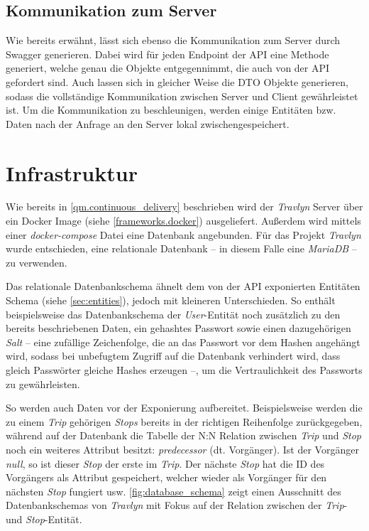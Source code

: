 		\subsection{Kommunikation zum Server}  %
		
			Wie bereits erwähnt, lässt sich ebenso die Kommunikation zum Server durch Swagger generieren. Dabei wird für jeden Endpoint der \acs{API} eine Methode generiert, welche genau die Objekte entgegennimmt, die auch von der \acs{API} gefordert sind. Auch lassen sich in gleicher Weise die \acs{DTO} Objekte generieren, sodass die vollständige Kommunikation zwischen Server und Client gewährleistet ist. Um die Kommunikation zu beschleunigen, werden einige Entitäten bzw. Daten nach der Anfrage an den Server lokal zwischengespeichert. 

	\section{Infrastruktur} %
	
		Wie bereits in \autoref{qm.continuous_delivery} beschrieben wird der \textit{Travlyn} Server über ein Docker Image (siehe \autoref{frameworks.docker}) ausgeliefert. Außerdem wird mittels einer \textit{docker-compose} Datei eine Datenbank angebunden. Für das Projekt \textit{Travlyn} wurde entschieden, eine relationale Datenbank -- in diesem Falle eine \textit{MariaDB} -- zu verwenden. 
		
		Das relationale Datenbankschema ähnelt dem von der \acs{API} exponierten Entitäten Schema (siehe \autoref{sec:entities}), jedoch mit kleineren Unterschieden. So enthält beispielsweise das Datenbankschema der \textit{User}-Entität noch zusätzlich zu den bereits beschriebenen Daten, ein gehashtes Passwort sowie einen dazugehörigen \textit{Salt} -- eine zufällige Zeichenfolge, die an das Passwort vor dem Hashen angehängt wird, sodass bei unbefugtem Zugriff auf die Datenbank verhindert wird, dass gleich Passwörter gleiche Hashes erzeugen --, um die Vertraulichkeit des Passworts zu gewährleisten. 
		
		So werden auch Daten vor der Exponierung aufbereitet. Beispielsweise werden die zu einem \textit{Trip} gehörigen \textit{Stops} bereits in der richtigen Reihenfolge zurückgegeben, während auf der Datenbank die Tabelle der N:N Relation zwischen \textit{Trip} und \textit{Stop} noch ein weiteres Attribut besitzt: \textit{predecessor} (dt. Vorgänger). Ist der Vorgänger \textit{null}, so ist dieser \textit{Stop} der erste im \textit{Trip}. Der nächste \textit{Stop} hat die ID des Vorgängers als Attribut gespeichert, welcher wieder als Vorgänger für den nächsten \textit{Stop} fungiert usw. \autoref{fig:database_schema} zeigt einen Ausschnitt des Datenbankschemas von \textit{Travlyn} mit Fokus auf der Relation zwischen der \textit{Trip}- und \textit{Stop}-Entität.
		
